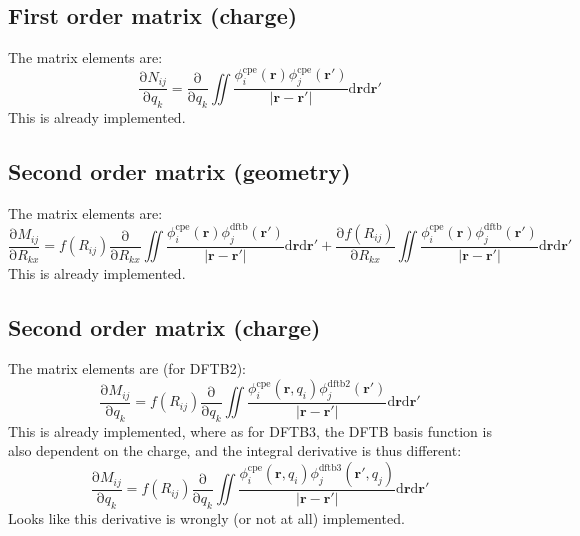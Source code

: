 \documentclass{article}
\numberwithin{equation}{section}
\begin{document}
\subsection{First order matrix (charge)}
The matrix elements are:
\begin{equation}
\frac{\mathrm{\partial} N_{ij}}{\mathrm{\partial}q_k} =
    \frac{\mathrm{\partial}}{\mathrm{\partial}q_k}  \iint \frac{\phi_i^\mathrm{cpe}\left(\mathbf{r}\right)\phi_j^\mathrm{cpe}\left(\mathbf{r'}\right)}{\left| \mathbf{r} - \mathbf{r'}\right|} \mathrm{d}\mathbf{r}\mathrm{d}\mathbf{r'}
\end{equation}
This is already implemented.

\subsection{Second order matrix (geometry)}
The matrix elements are:
\begin{equation}
    \frac{\mathrm{\partial} M_{ij}}{\mathrm{\partial}R_{kx}} =
    f(R_{ij})\frac{\mathrm{\partial}}{\mathrm{\partial}R_{kx}}  \iint \frac{\phi_i^\mathrm{cpe}\left(\mathbf{r}\right)\phi_j^\mathrm{dftb}\left(\mathbf{r'}\right)}{\left| \mathbf{r} - \mathbf{r'}\right|} \mathrm{d}\mathbf{r}\mathrm{d}\mathbf{r'}
    + \frac{\mathrm{\partial}f(R_{ij})}{\mathrm{\partial}R_{kx}}  \iint \frac{\phi_i^\mathrm{cpe}\left(\mathbf{r}\right)\phi_j^\mathrm{dftb}\left(\mathbf{r'}\right)}{\left| \mathbf{r} - \mathbf{r'}\right|} \mathrm{d}\mathbf{r}\mathrm{d}\mathbf{r'}
\end{equation}
This is already implemented.

\subsection{Second order matrix (charge)}
The matrix elements are (for DFTB2):
\begin{equation}
\frac{\mathrm{\partial} M_{ij}}{\mathrm{\partial}q_k} =
    f(R_{ij})\frac{\mathrm{\partial}}{\mathrm{\partial}q_k}  \iint \frac{\phi_i^\mathrm{cpe}\left(\mathbf{r}, q_i\right)\phi_j^\mathrm{dftb2}\left(\mathbf{r'}\right)}{\left| \mathbf{r} - \mathbf{r'}\right|} \mathrm{d}\mathbf{r}\mathrm{d}\mathbf{r'}
\end{equation}
This is already implemented, where as for DFTB3, the DFTB basis function is also dependent on the charge, and the integral derivative is thus different:
\begin{equation}
\frac{\mathrm{\partial} M_{ij}}{\mathrm{\partial}q_k} =
    f(R_{ij})\frac{\mathrm{\partial}}{\mathrm{\partial}q_k}  \iint \frac{\phi_i^\mathrm{cpe}\left(\mathbf{r}, q_i\right)\phi_j^\mathrm{dftb3}\left(\mathbf{r'}, q_j\right)}{\left| \mathbf{r} - \mathbf{r'}\right|} \mathrm{d}\mathbf{r}\mathrm{d}\mathbf{r'}
\end{equation}
Looks like this derivative is wrongly (or not at all) implemented.
\end{document}
